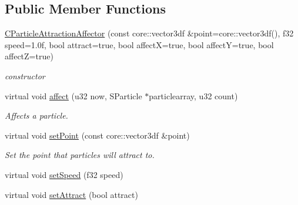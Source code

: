 \subsection*{Public Member Functions}
\begin{DoxyCompactItemize}
\item 
\hypertarget{classirr_1_1scene_1_1_c_particle_attraction_affector_a0e0d478b1e51a4e7653caaed76033bfe}{\hyperlink{classirr_1_1scene_1_1_c_particle_attraction_affector_a0e0d478b1e51a4e7653caaed76033bfe}{C\-Particle\-Attraction\-Affector} (const core\-::vector3df \&point=core\-::vector3df(), f32 speed=1.\-0f, bool attract=true, bool affect\-X=true, bool affect\-Y=true, bool affect\-Z=true)}\label{classirr_1_1scene_1_1_c_particle_attraction_affector_a0e0d478b1e51a4e7653caaed76033bfe}

\begin{DoxyCompactList}\small\item\em constructor \end{DoxyCompactList}\item 
virtual void \hyperlink{classirr_1_1scene_1_1_c_particle_attraction_affector_a0949adc32bdf31ff716a8826236b9ad6}{affect} (u32 now, S\-Particle $\ast$particlearray, u32 count)
\begin{DoxyCompactList}\small\item\em Affects a particle. \end{DoxyCompactList}\item 
\hypertarget{classirr_1_1scene_1_1_c_particle_attraction_affector_a4553f7c685cf05d43c9f124fbd4395de}{virtual void \hyperlink{classirr_1_1scene_1_1_c_particle_attraction_affector_a4553f7c685cf05d43c9f124fbd4395de}{set\-Point} (const core\-::vector3df \&point)}\label{classirr_1_1scene_1_1_c_particle_attraction_affector_a4553f7c685cf05d43c9f124fbd4395de}

\begin{DoxyCompactList}\small\item\em Set the point that particles will attract to. \end{DoxyCompactList}\item 
virtual void \hyperlink{classirr_1_1scene_1_1_c_particle_attraction_affector_a530343a28ba0d7f7e9a6394154c1ca7f}{set\-Speed} (f32 speed)
\item 
\hypertarget{classirr_1_1scene_1_1_c_particle_attraction_affector_acb8bf35e3b0ab8a7ba85b535ca4360fd}{virtual void \hyperlink{classirr_1_1scene_1_1_c_particle_attraction_affector_acb8bf35e3b0ab8a7ba85b535ca4360fd}{set\-Attract} (bool attract)}\label{classirr_1_1scene_1_1_c_particle_attraction_affector_acb8bf35e3b0ab8a7ba85b535ca4360fd}


\end{DoxyCompactItemize}
